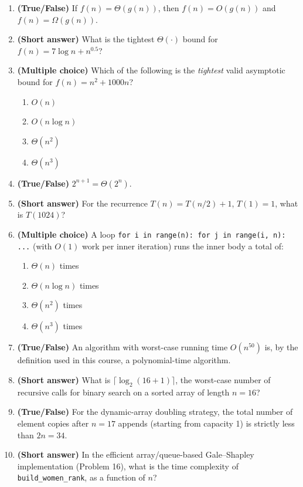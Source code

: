 \documentclass[11pt]{article}
\begin{document}
\begin{enumerate}[label=\textbf{B\arabic*.}, leftmargin=2.2em]

\item \textbf{(True/False)} If $f(n) = \Theta(g(n))$, then $f(n) = O(g(n))$ and $f(n) =
\Omega(g(n))$.

\item \textbf{(Short answer)} What is the tightest $\Theta(\cdot)$ bound for $f(n) = 7
\log n + n^{0.5}$?

\item \textbf{(Multiple choice)} Which of the following is the \emph{tightest} valid
asymptotic bound for $f(n) = n^2 + 1000n$?
\begin{enumerate}[label=(\alph*)]
    \item $O(n)$
    \item $O(n \log n)$
    \item $\Theta(n^2)$
    \item $\Theta(n^3)$
\end{enumerate}

\item \textbf{(True/False)} $2^{n+1} = \Theta(2^n)$.

\item \textbf{(Short answer)} For the recurrence $T(n) = T(n/2) + 1$, $T(1) = 1$, what is
$T(1024)$?

\item \textbf{(Multiple choice)} A loop \texttt{for i in range(n): for j in range(i, n):
...} (with $O(1)$ work per inner iteration) runs the inner body a total of:
\begin{enumerate}[label=(\alph*)]
    \item $\Theta(n)$ times
    \item $\Theta(n \log n)$ times
    \item $\Theta(n^2)$ times
    \item $\Theta(n^3)$ times
\end{enumerate}

\item \textbf{(True/False)} An algorithm with worst-case running time $O(n^{50})$ is, by
the definition used in this course, a polynomial-time algorithm.

\item \textbf{(Short answer)} What is $\lceil \log_2(16+1) \rceil$, the worst-case number
of recursive calls for binary search on a sorted array of length $n=16$?

\item \textbf{(True/False)} For the dynamic-array doubling strategy, the total number of
element copies after $n = 17$ appends (starting from capacity 1) is strictly less than
$2n = 34$.

\item \textbf{(Short answer)} In the efficient array/queue-based Gale--Shapley
implementation (Problem 16), what is the time complexity of \texttt{build\_women\_rank},
as a function of $n$?

\end{enumerate}
\end{document}
